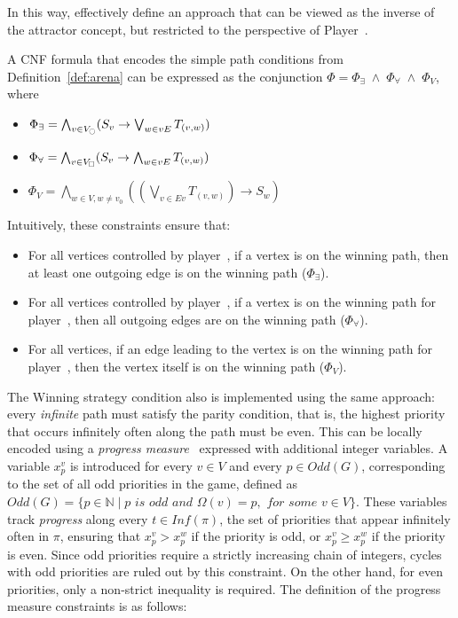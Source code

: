 \documentclass{article}
\begin{document}
In this way, \cite{Heljanko:2012} effectively define an approach that can be viewed as the inverse of the attractor concept, but restricted to the perspective of Player~\even.

\begin{definition} A CNF formula that encodes the simple path conditions from Definition~\ref{def:arena} can be expressed as the conjunction $\Phi = \Phi_\exists \;\wedge\; \Phi_\forall \;\wedge\; \Phi_V$, where
\begin{itemize}\label{def:cnf}
    \item $\Phi_\exists = \bigwedge_{v \in V_{\subeven}} (S_v \rightarrow \bigvee_{w \in vE} T_{(v,w)})$
    \item $\Phi_\forall = \bigwedge_{v \in V_{\subodd}} (S_v \rightarrow \bigwedge_{w \in vE} T_{(v,w)})$
    \item $\Phi_V = \bigwedge_{w \in V, w \neq v_0} \left( \left(\bigvee_{v \in Ev} T_{(v,w)}\right) \rightarrow S_w \right)$
\end{itemize}

Intuitively, these constraints ensure that:
\begin{itemize}
    \item For all vertices controlled by player~\even, if a vertex is on the winning path, then at least one outgoing edge is on the winning path ($\Phi_\exists$).
    \item For all vertices controlled by player~\odd, if a vertex is on the winning path for player~\even, then all outgoing edges are on the winning path ($\Phi_\forall$).
    \item For all vertices, if an edge leading to the vertex is on the winning path for player~\even, then the vertex itself is on the winning path ($\Phi_V$).
\end{itemize}
\end{definition}

The Winning strategy condition also is implemented using the same approach: every \textit{infinite} path must satisfy the parity condition, that is, the highest priority that occurs infinitely often along the path must be even. This can be locally encoded using a \textit{progress measure}~\cite{Heljanko:2012,Jurdziński:2000} expressed with additional integer variables. A variable $x_p^v$ is introduced for every $v \in V$ and every $p \in \textit{Odd}(G)$, corresponding to the set of all odd priorities in the game, defined as $\textit{Odd}(G) = \{ p\in {\mathbb N} \mid p \textit{ is odd and } \Omega(v) = p, \textit{ for some } v \in V \}$. These variables track \textit{progress} along every $ t \in \textit{Inf}(\pi) $, the set of priorities that appear infinitely often in $\pi$, ensuring that $x_p^v > x_p^w$ if the priority is odd, or $x_p^v \geq x_p^w$ if the priority is even. Since odd priorities require a strictly increasing chain of integers, cycles with odd priorities are ruled out by this constraint. On the other hand, for even priorities, only a non-strict inequality is required.
%
The definition of the progress measure constraints is as follows: \cite{Heljanko:2012,Cotton:2004}
\end{document}
